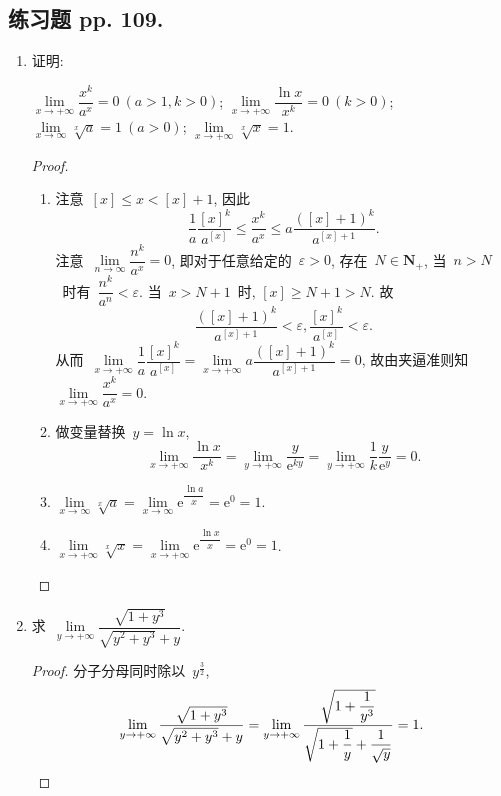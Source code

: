 \documentclass[UTF8,a4paper,11pt,twoside]{book}
\newcommand{\e}{\mathrm e}
\begin{document}
\subsection{练习题 pp. 109.}
\begin{enumerate}
	\item 证明:
	      \begin{tabenum}[(1)]
		      \tabenumitem $\lim\limits_{x\to+\infty} \dfrac{x^k}{a^x}=0 \ (a>1,k>0)$;
		      \tabenumitem $\lim\limits_{x\to+\infty} \dfrac{\ln{x}}{x^k}=0 \ (k>0)$;\\
		      \tabenumitem $\lim\limits_{x\to\infty} \sqrt[x]{a}=1 \ (a>0)$;
		      \tabenumitem $\lim\limits_{x\to+\infty} \sqrt[x]{x}=1$.
	      \end{tabenum}
	      \begin{proof}
		      \begin{enumerate}[(1)]
			      \item 注意~$[x]\leqslant x<[x]+1$, 因此
			            \[
				            \dfrac{1}{a}\dfrac{[x]^k}{a^[x]}\leqslant\dfrac{x^k}{a^x}\leqslant a\dfrac{([x]+1)^k}{a^{[x]+1}}.
			            \]
			            注意~$\lim\limits_{n\to\infty} \dfrac{n^k}{a^x}=0$, 即对于任意给定的~$\varepsilon>0$, 存在~$N\in\mathbf{N}_{+}$, 当~$n>N$~时有~$\dfrac{n^k}{a^n}<\varepsilon$. 当~$x>N+1$~时, $[x]\geqslant N+1>N$. 故
			            \[
				            \dfrac{([x]+1)^k}{a^{[x]+1}}<\varepsilon, \dfrac{[x]^k}{a^{[x]}}<\varepsilon.
			            \]
			            从而~$\lim\limits_{x\to+\infty} \dfrac{1}{a}\dfrac{[x]^k}{a^[x]}=\lim\limits_{x\to+\infty} a\dfrac{([x]+1)^k}{a^{[x]+1}}=0$, 故由夹逼准则知~$\lim\limits_{x\to+\infty} \dfrac{x^k}{a^x}=0$.

			      \item 做变量替换~$y=\ln{x}$,
			            \[
				            \lim\limits_{x\to+\infty} \dfrac{\ln{x}}{x^k}=\lim\limits_{y\to+\infty} \dfrac{y}{\e^{ky}}=\lim\limits_{y\to+\infty} \dfrac{1}{k}\dfrac{y}{\e^y}=0.
			            \]

			      \item $\lim\limits_{x\to\infty} \sqrt[x]{a}=\lim\limits_{x\to\infty} \e^{\dfrac{\ln{a}}{x}} =\e^0=1$.

			      \item $\lim\limits_{x\to+\infty} \sqrt[x]{x}=\lim\limits_{x\to+\infty} \e^{\dfrac{\ln{x}}{x}}=\e^0=1$. \qedhere
		      \end{enumerate}
	      \end{proof}

	\item 求~$\lim\limits_{y\to+\infty} \dfrac{\sqrt{1+y^3}}{\sqrt{y^2+y^3}+y}$.
	      \begin{proof}
		      分子分母同时除以~$y^{\frac{3}{2}}$,
		      \[
			      \lim\limits_{y\to+\infty} \dfrac{\sqrt{1+y^3}}{\sqrt{y^2+y^3}+y}=\lim\limits_{y\to+\infty} \dfrac{\sqrt{1+\dfrac{1}{y^3}}}{\sqrt{1+\dfrac{1}{y}}+\dfrac{1}{\sqrt{y}}}=1. \qedhere
		      \]
	      \end{proof}


\end{enumerate}
\end{document}
